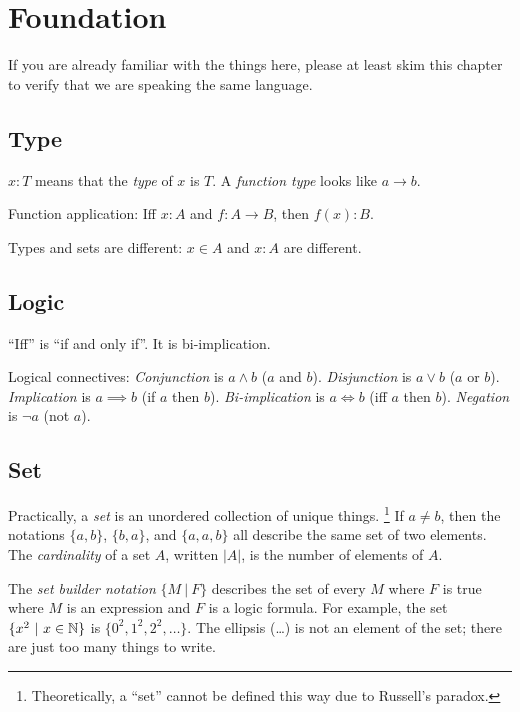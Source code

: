 \chapter{Foundation}

If you are already familiar with the things here,
please at least skim this chapter to verify that
we are speaking the same language.

\section{Type}

%
\(x : T\) means that the \emph{type} of \(x\) is \(T\).
%
%
A \emph{function type} looks like \(a \to b\).

Function application:
Iff \(x:A\) and \(f:A\to B\), then \(f(x):B\).

Types and sets are different:
\(x \in A\) and \(x : A\) are different.

\section{Logic}

%
%
``Iff'' is ``if and only if''.
It is bi-implication.

%
%
Logical connectives:
%
%
\emph{Conjunction} is \(a \wedge b\) (\(a\) and \(b\)).
%
%
\emph{Disjunction} is \(a \vee b\) (\(a\) or \(b\)).
%
\emph{Implication} is \(a \implies b\) (if \(a\) then \(b\)).
%
\emph{Bi-implication} is \(a \iff b\) (iff \(a\) then \(b\)).
%
%
\emph{Negation} is \(\neg a\) (not \(a\)).

\section{Set}

%
Practically, a \emph{set} is an unordered collection of unique things.%
%
\footnote{Theoretically, a ``set'' cannot be defined this way due to Russell's paradox.}
If \(a \neq b\), then the notations \(\{a,b\}\), \(\{b,a\}\), and \(\{a,a,b\}\)
all describe the same set of two elements.
The \emph{cardinality} of a set \(A\), written \(|A|\),
is the number of elements of \(A\).

%
%
The \emph{set builder notation}
\( \{ M ~|~ F \} \)
describes the set of every \(M\) where \(F\) is true
where \(M\) is an expression and \(F\) is a logic formula.
For example, the set \(\{ x^2 ~|~ x \in \mathbb{N} \}\) is \(\{ 0^2, 1^2, 2^2, \ldots \}\).
The ellipsis (\ldots) is not an element of the set;
there are just too many things to write.

